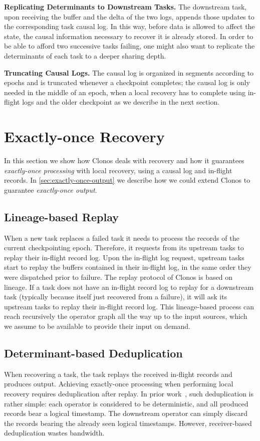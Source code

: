 \documentclass[sigconf]{acmart}
\newcommand{\para}[1]{\vspace{1mm}\noindent\textbf{#1.}}
\begin{document}
\para{Replicating Determinants to Downstream Tasks} The downstream task, upon receiving the buffer and the delta of the two logs, appends those updates to the corresponding task causal log. In this way, before data is allowed to affect the state, the causal information necessary to recover it is already stored. In order to be able to afford two successive tasks failing, one might also want to replicate the determinants of each task to a deeper sharing depth. 

\para{Truncating Causal Logs} The causal log is organized in segments according to epochs and is truncated whenever a checkpoint completes; the causal log is only needed in the middle of an epoch, when a local recovery has to complete using in-flight logs and the older checkpoint as we describe in the next section.

\section{Exactly-once Recovery}
\label{sec:correctness}

In this section we show how Clonos deals with recovery and how it guarantees \textit{exactly-once processing} with local recovery, using a causal log and in-flight records. In \autoref{sec:exactly-once-output} we describe how we could extend Clonos to guarantee \textit{exactly-once output}.


\subsection{Lineage-based Replay}
\label{sub:lineage}


When a new task replaces a failed task it needs to process the records of the current checkpointing epoch.
Therefore, it requests from its upstream tasks to replay their in-flight record log.
Upon the in-flight log request, upstream tasks start to replay the buffers contained in their in-flight log, in the same order they were dispatched prior to failure. The replay protocol of Clonos is based on lineage.
If a task does not have an in-flight record log to replay for a downstream task (typically because itself just recovered from a failure), it will ask its upstream tasks to replay their in-flight record log.
This lineage-based process can reach recursively the operator graph all the way up to the input sources, which we assume to be available to provide their input on demand.



\subsection{Determinant-based Deduplication}
When recovering a task, the task replays the received in-flight records and produces output. Achieving exactly-once processing when performing local recovery requires deduplication after replay. In prior work~\cite{FernandezMK13}, such deduplication is rather simple: each operator is considered to be deterministic, and all produced records bear a logical timestamp. The downstream operator can simply discard the records bearing the already seen logical timestamps. However, receiver-based deduplication wastes bandwidth. 
\end{document}
